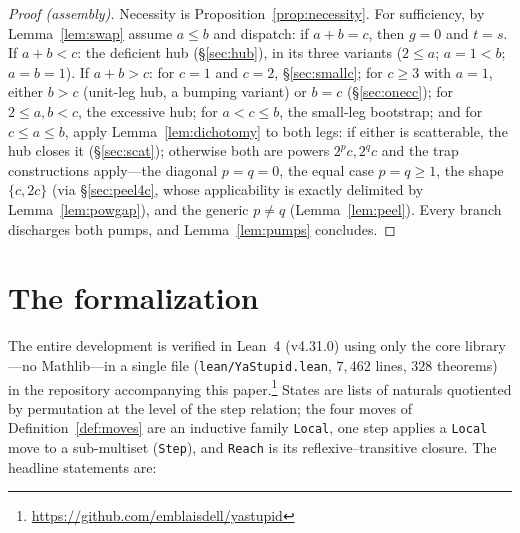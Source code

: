 \documentclass[11pt]{article}
\theoremstyle{definition}
\theoremstyle{remark}
\begin{document}
\begin{proof}[Proof (assembly)]
Necessity is Proposition~\ref{prop:necessity}.  For sufficiency, by
Lemma~\ref{lem:swap} assume $a\le b$ and dispatch:
if $a+b=c$, then $g=0$ and $t=s$.  If $a+b<c$: the deficient hub
(\S\ref{sec:hub}), in its three variants ($2\le a$; $a=1<b$; $a=b=1$).  If
$a+b>c$: for $c=1$ and $c=2$, \S\ref{sec:smallc}; for $c\ge3$ with $a=1$,
either $b>c$ (unit-leg hub, a bumping variant) or $b=c$
(\S\ref{sec:onecc}); for $2\le a,b<c$, the excessive hub; for $a<c\le b$,
the small-leg bootstrap; and for $c\le a\le b$, apply
Lemma~\ref{lem:dichotomy} to both legs: if either is scatterable, the hub
closes it (\S\ref{sec:scat}); otherwise both are powers $2^pc,2^qc$ and the
trap constructions apply---the diagonal $p=q=0$, the equal case $p=q\ge1$,
the shape $\{c,2c\}$ (via \S\ref{sec:peel4c}, whose applicability is
exactly delimited by Lemma~\ref{lem:powgap}), and the generic
$p\ne q$ (Lemma~\ref{lem:peel}).  Every branch discharges both pumps, and
Lemma~\ref{lem:pumps} concludes.
\end{proof}

\section{The formalization}\label{sec:mech}

The entire development is verified in Lean~4 (v4.31.0) \cite{lean4} using
only the core library---no \textsf{Mathlib}---in a single file
(\texttt{lean/YaStupid.lean}, $7{,}462$ lines, $328$ theorems) in the
repository accompanying this paper.\footnote{\url{https://github.com/emblaisdell/yastupid}}
States are lists of naturals quotiented by permutation at the level of the
step relation; the four moves of Definition~\ref{def:moves} are an
inductive family \texttt{Local}, one step applies a \texttt{Local} move to
a sub-multiset (\texttt{Step}), and \texttt{Reach} is its
reflexive--transitive closure.  The headline statements are:
\end{document}
